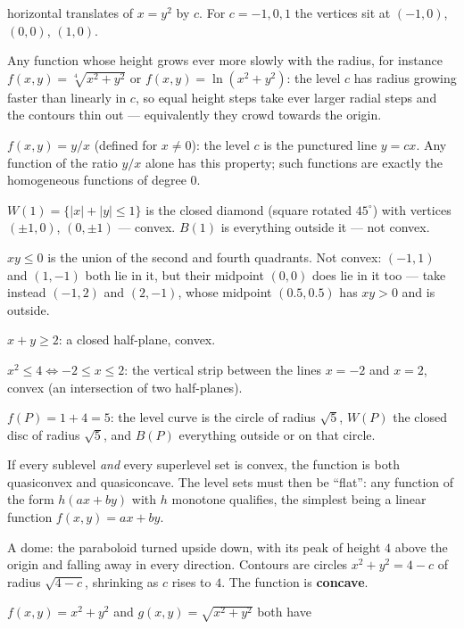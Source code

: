 \begin{solutions}
        horizontal translates of $x=y^{2}$ by $c$. For $c=-1,0,1$ the
        vertices sit at $(-1,0)$, $(0,0)$, $(1,0)$.
  \item Any function whose height grows ever more slowly with the radius,
        for instance $f(x,y)=\sqrt[4]{x^{2}+y^{2}}$ or
        $f(x,y)=\ln(x^{2}+y^{2})$: the level $c$ has radius growing faster
        than linearly in $c$, so equal height steps take ever larger
        radial steps and the contours thin out --- equivalently they crowd
        towards the origin.
  \item $f(x,y)=y/x$ (defined for $x\neq0$): the level $c$ is the punctured
        line $y=cx$. Any function of the ratio $y/x$ alone has this
        property; such functions are exactly the homogeneous functions of
        degree $0$.
  \item $W(1)=\{|x|+|y|\le1\}$ is the closed diamond (square rotated
        $45^{\circ}$) with vertices $(\pm1,0)$, $(0,\pm1)$ --- convex.
        $B(1)$ is everything outside it --- not convex.
  \item $xy\le0$ is the union of the second and fourth quadrants. Not
        convex: $(-1,1)$ and $(1,-1)$ both lie in it, but their midpoint
        $(0,0)$ does lie in it too --- take instead $(-1,2)$ and $(2,-1)$,
        whose midpoint $(0.5,0.5)$ has $xy>0$ and is outside.
  \item $x+y\ge2$: a closed half-plane, convex.
  \item $x^{2}\le4\iff-2\le x\le2$: the vertical strip between the lines
        $x=-2$ and $x=2$, convex (an intersection of two half-planes).
  \item $f(P)=1+4=5$: the level curve is the circle of radius $\sqrt5$,
        $W(P)$ the closed disc of radius $\sqrt5$, and $B(P)$ everything
        outside or on that circle.
  \item If every sublevel \emph{and} every superlevel set is convex, the
        function is both quasiconvex and quasiconcave. The level sets must
        then be ``flat'': any function of the form $h(ax+by)$ with $h$
        monotone qualifies, the simplest being a linear function
        $f(x,y)=ax+by$.
  \item A dome: the paraboloid turned upside down, with its peak of height
        $4$ above the origin and falling away in every direction. Contours
        are circles $x^{2}+y^{2}=4-c$ of radius $\sqrt{4-c}$, shrinking as
        $c$ rises to $4$. The function is \textbf{concave}.
  \item $f(x,y)=x^{2}+y^{2}$ and $g(x,y)=\sqrt{x^{2}+y^{2}}$ both have

\end{solutions}

